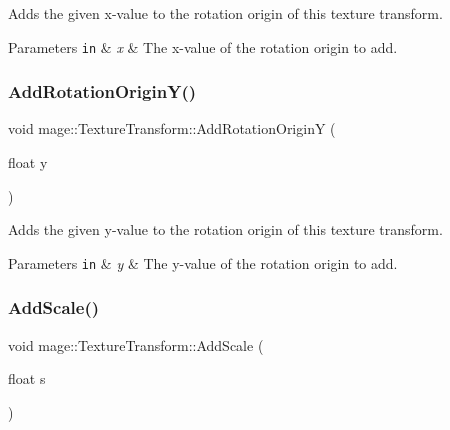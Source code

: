 Adds the given x-\/value to the rotation origin of this texture transform.


\begin{DoxyParams}[1]{Parameters}
\mbox{\tt in}  & {\em x} & The x-\/value of the rotation origin to add. \\
\hline
\end{DoxyParams}
\hypertarget{structmage_1_1_texture_transform_a05818fe4e7c2994f790db0ed4490ba1e}{}\label{structmage_1_1_texture_transform_a05818fe4e7c2994f790db0ed4490ba1e} 
\subsubsection{\texorpdfstring{Add\+Rotation\+Origin\+Y()}{AddRotationOriginY()}}
{\footnotesize\ttfamily void mage\+::\+Texture\+Transform\+::\+Add\+Rotation\+OriginY (\begin{DoxyParamCaption}\item[{float}]{y }\end{DoxyParamCaption})\hspace{0.3cm}{\ttfamily [noexcept]}}

Adds the given y-\/value to the rotation origin of this texture transform.


\begin{DoxyParams}[1]{Parameters}
\mbox{\tt in}  & {\em y} & The y-\/value of the rotation origin to add. \\
\hline
\end{DoxyParams}
\hypertarget{structmage_1_1_texture_transform_aabe287a058a3b595c6f90fa2e1078adb}{}\label{structmage_1_1_texture_transform_aabe287a058a3b595c6f90fa2e1078adb} 
\subsubsection{\texorpdfstring{Add\+Scale()}{AddScale()}\hspace{0.1cm}{\footnotesize\ttfamily [1/4]}}
{\footnotesize\ttfamily void mage\+::\+Texture\+Transform\+::\+Add\+Scale (\begin{DoxyParamCaption}\item[{float}]{s }\end{DoxyParamCaption})\hspace{0.3cm}{\ttfamily [noexcept]}}

